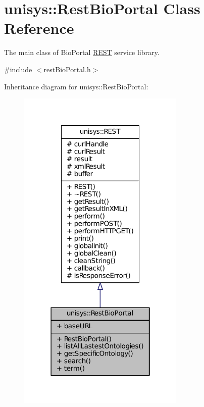 \hypertarget{classunisys_1_1RestBioPortal}{\section{unisys\-:\-:Rest\-Bio\-Portal Class Reference}
\label{classunisys_1_1RestBioPortal}
}


The main class of Bio\-Portal \hyperlink{classunisys_1_1REST}{R\-E\-S\-T} service library.  




{\ttfamily \#include $<$rest\-Bio\-Portal.\-h$>$}



Inheritance diagram for unisys\-:\-:Rest\-Bio\-Portal\-:
\nopagebreak
\begin{figure}[H]
\begin{center}
\leavevmode
\includegraphics[width=226pt]{classunisys_1_1RestBioPortal__inherit__graph}
\end{center}
\end{figure}


